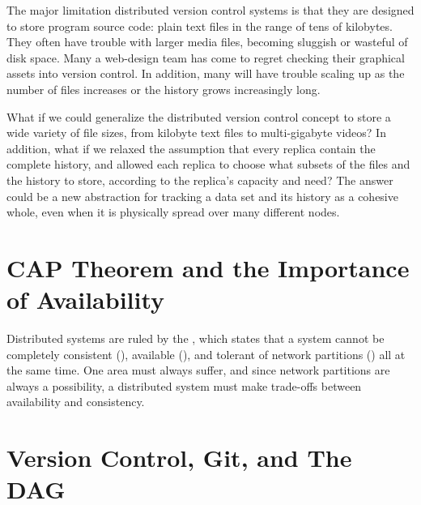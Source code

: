 The major limitation distributed version control systems is that they are
designed to store program source code: plain text files in the range of tens of
kilobytes. They often have trouble with larger media files, becoming sluggish or
wasteful of disk space. Many a web-design team has come to regret checking their
graphical assets into version control. In addition, many will have trouble
scaling up as the number of files increases or the history grows increasingly
long.

What if we could generalize the distributed version control concept to store a
wide variety of file sizes, from kilobyte text files to multi-gigabyte videos?
In addition, what if we relaxed the assumption that every replica contain the
complete history, and allowed each replica to choose what subsets of the files
and the history to store, according to the replica's capacity and need? The
answer could be a new abstraction for tracking a data set and its history as a
cohesive whole, even when it is physically spread over many different nodes.

%



\section{CAP Theorem and the Importance of Availability}

Distributed systems are ruled by the  \cite{cap_origin},
which states that a system cannot be completely consistent (),
available (), and tolerant of network partitions () all at
the same time. One area must always suffer, and since network partitions are
always a possibility, a distributed system must make trade-offs between
availability and consistency.





%



\section{Version Control, Git, and The DAG}

